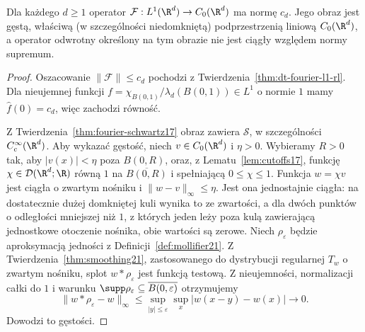\begin{twierdzenie}
\label{thm:dt-fourier-l1-range}
Dla każdego $d\ge1$ operator
$\mathcal F:L^1(\R^d)\to C_0(\R^d)$ ma normę $c_d$.
Jego obraz jest gęstą, właściwą (w szczególności
niedomkniętą) podprzestrzenią liniową $C_0(\R^d)$,
a operator odwrotny określony na tym obrazie
nie jest ciągły względem normy supremum.
\end{twierdzenie}
\begin{proof}
Oszacowanie $\|\mathcal F\|\le c_d$ pochodzi z
Twierdzenia~\ref{thm:dt-fourier-l1-rl}. Dla nieujemnej
funkcji $f=\chi_{B(0,1)}/\lambda_d(B(0,1))\in L^1$
o normie $1$ mamy
$\widehat f(0)=c_d$, więc zachodzi równość.

Z Twierdzenia~\ref{thm:fourier-schwartz17}
obraz zawiera $\mathcal S$, w szczególności
$C_c^\infty(\R^d)$.
Aby wykazać gęstość, niech $v\in C_0(\R^d)$ i $\eta>0$.
Wybieramy $R>0$ tak, aby $|v(x)|<\eta$ poza $B(0,R)$,
oraz, z Lematu~\ref{lem:cutoffs17}, funkcję
$\chi\in\mathcal D(\R^d;\R)$ równą $1$ na
$\overline{B(0,R)}$ i spełniającą $0\le\chi\le1$.
Funkcja $w=\chi v$ jest ciągła o zwartym nośniku
i $\|w-v\|_\infty\le\eta$.
Jest ona jednostajnie ciągła: na dostatecznie dużej
domkniętej kuli wynika to ze zwartości, a dla dwóch
punktów o odległości mniejszej niż $1$, z których
jeden leży poza kulą zawierającą jednostkowe otoczenie
nośnika, obie wartości są zerowe.
Niech $\rho_\varepsilon$ będzie aproksymacją jedności
z Definicji~\ref{def:mollifier21}.
Z Twierdzenia~\ref{thm:smoothing21}, zastosowanego
do dystrybucji regularnej $T_w$ o zwartym nośniku,
splot $w*\rho_\varepsilon$ jest funkcją testową.
Z nieujemności, normalizacji całki do $1$ i warunku
$\supp\rho_\varepsilon\subseteq\overline{B(0,\varepsilon)}$
otrzymujemy
\[
 \|w*\rho_\varepsilon-w\|_\infty
 \le\sup_{|y|\le\varepsilon}\sup_x|w(x-y)-w(x)|
 \longrightarrow0.
\]
Dowodzi to gęstości.


\end{proof}
